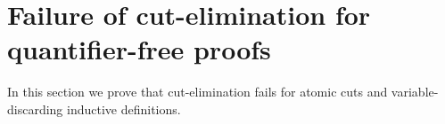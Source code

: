 \documentclass[a4paper,12pt]{article}
\newcommand{\FV}              { {\tt FV} }
\begin{document}








\section{Failure of cut-elimination for quantifier-free proofs}
\label{section-failure}
In this section we prove that cut-elimination fails for atomic cuts and variable-discarding inductive definitions. 
\end{document}
